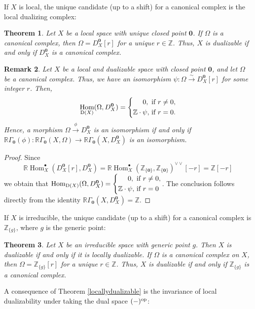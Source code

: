 \documentclass[amssymb,amscd,11pt,20pt]{amsart}
\newcommand{\ZZ}{{\mathbb Z}}
\newcommand{\RR}{\mathbb R}
\newcommand{\0}{\mathbf 0}
\DeclareMathOperator{\Hom}{{Hom}}
\newcommand{\pun}{{\scriptscriptstyle \bullet}}
\theoremstyle{plain}
\newtheorem{thm}{Theorem}[section]
\newtheorem{rem}[thm]{Remark}
\numberwithin{equation}{thm}
\begin{document}
If $X$ is   local, the  unique candidate (up to a shift) for a  canonical complex is the local dualizing complex:

\begin{thm}\cite[Thm. 4.16]{ST2}\label{dualizablelocal} Let $X$ be a local space with unique closed point $\0$. If $\Omega$ is a canonical complex, then $\Omega=D_X^\0[r]$ for a unique $r\in\ZZ$. Thus, $X$ is dualizable if and only if $D_X^\0$ is a canonical complex.
\end{thm}

\begin{rem}\label{remark}{\rm Let $X$ be a local and dualizable space with closed point $\0$, and let $\Omega$ be a canonical complex. Thus, we have an isomorphism $\psi\colon\Omega\overset\sim\to D_{X}^\0[r]$ for some integer $r$. Then,  
\[ \Hom_{\mathrm{D}(X)} (\Omega ,D_{X}^\0)= \left\{\aligned 0,\, &\text{ if }r\neq 0,\\ \ZZ\cdot\psi, &\text{ if } r=0.\endaligned\right.\] Hence, a morphism $  \Omega \overset\phi\to D_{X}^{\0}$ is an isomorphism if and only if $\RR\Gamma_\0(\phi)\colon \RR\Gamma_\0(X,\Omega) \to \RR\Gamma_\0(X,D_{X}^{\0})$ is an isomorphism.}
\end{rem}

\begin{proof} Since 
\[ \RR\Hom^\pun_X(D_{X}^{\0}[r],D_{X}^{\0})=\RR\Hom_X^\pun(\ZZ_{\{\0\}}, \ZZ_{\{\0\}})^{\vee\vee} [-r]=\ZZ[-r]\] we obtain that $\Hom_{\mathrm{D}(X)}(\Omega ,D_{X}^{\0})= \left\{\aligned 0,\, &\text{ if }r\neq 0,\\ \ZZ\cdot\psi, &\text{ if } r=0\endaligned\right.$. The conclusion follows directly  from the identity $\RR\Gamma_\0(X,D_{X}^{\0})=\ZZ$.
\end{proof}

If $X$ is   irreducible, the  unique candidate (up to a shift) for a  canonical complex is $\ZZ_{\{g\}}$, where $g$ is the generic point:


\begin{thm}\cite[Thm. 4.18]{ST2} \label{dualizableirreducible} Let $X$ be an irreducible space with generic point $g$. Then $X$ is dualizable if and only if it is locally dualizable. If $\Omega$ is a canonical complex on $X$, then $\Omega=\ZZ_{\{g\}}[r]$ for a unique $r\in\ZZ$. Thus, $X$ is dualizable if and only if $\ZZ_{\{g\}}$ is a canonical complex.
\end{thm}

A consequence of Theorem \ref{locallydualizable} is the invariance of local dualizability under taking the dual space $(-)^{\text{\rm op}}$:
\end{document}
